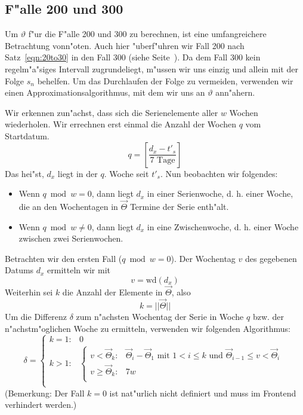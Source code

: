 \documentclass[a4paper]{article}
\newcommand*{\wdf}{\mathrm{wd}}
\numberwithin{equation}{section}
\begin{document}
%
%
\subsection{F"alle 200 und 300}
Um $\vartheta$ f"ur die F"alle 200 und 300 zu berechnen, ist eine umfangreichere
Betrachtung vonn"oten. Auch hier "uberf"uhren wir Fall 200 nach
Satz~\ref{eqn:20to30} in den Fall 300 (siehe Seite~\pageref{eqn:20to30}). Da
dem Fall 300 kein regelm"a"siges Intervall zugrundeliegt, m"ussen wir uns einzig
und allein mit der Folge $s_n$ behelfen. Um das Durchlaufen der Folge zu
vermeiden, verwenden wir einen Approximationsalgorithmus, mit dem wir uns an
$\vartheta$ ann"ahern.

Wir erkennen zun"achst, dass sich die Serienelemente aller $w$ Wochen
wiederholen. Wir errechnen erst einmal die Anzahl der Wochen $q$ vom Startdatum.
\begin{equation}
  q = \left[\frac{d_x - t'_s}{7 \textrm{ Tage}}\right]
\end{equation}
Das hei"st, $d_x$ liegt in der $q$. Woche seit $t'_s$. Nun beobachten wir
folgendes:
\begin{itemize}
\item Wenn $q \bmod w = 0$, dann liegt $d_x$ in einer Serienwoche, d. h. einer
  Woche, die an den Wochentagen in $\vec{\Theta}$ Termine der Serie enth"alt.
\item Wenn $q \bmod w \ne 0$, dann liegt $d_x$ in eine Zwischenwoche, d. h.
  einer Woche zwischen zwei Serienwochen.
\end{itemize}

\noindent Betrachten wir den ersten Fall ($q \bmod w = 0$). Der Wochentag $v$
des gegebenen Datums $d_x$ ermitteln wir mit
\begin{equation}v = \wdf(d_x)\end{equation}
Weiterhin sei $k$ die Anzahl der Elemente in $\vec{\Theta}$, also
\begin{equation}k = ||\vec{\Theta}||\end{equation}
Um die Differenz $\delta$ zum n"achsten Wochentag der Serie in Woche $q$ bzw.
der n"achstm"oglichen Woche zu ermitteln, verwenden wir folgenden Algorithmus:
\begin{equation}
  \delta = \left\{\begin{array}{ll}
    k = 1 : & 0 \\
    k > 1 : & \left\{\begin{array}{ll}
      v < \vec{\Theta}_k: & \vec{\Theta}_i - \vec{\Theta}_{1} \textrm{ mit }
      1 < i \le k \textrm{ und } \vec{\Theta}_{i-1} \le v < \vec{\Theta}_i \\
      v \ge \vec{\Theta}_k: & 7w \\
      \end{array}\right. \\
    \end{array}\right.
\end{equation}
(Bemerkung: Der Fall $k = 0$ ist nat"urlich nicht definiert und muss im Frontend
verhindert werden.)
\end{document}
